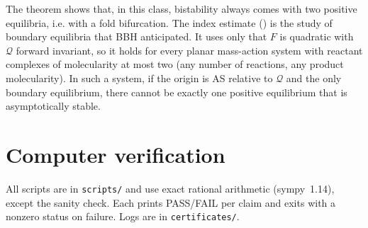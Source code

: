 \documentclass[11pt,a4paper]{report}
\newcommand{\Q}{\mathcal{Q}}
\begin{document}
\begin{remark}
The theorem shows that, in this class, bistability always comes with two positive equilibria, i.e. with a fold
bifurcation. The index estimate () is the study of boundary equilibria that BBH anticipated. It
uses only that \(F\) is quadratic with \(\Q\) forward invariant, so it holds for every planar mass-action system with
reactant complexes of molecularity at most two (any number of reactions, any product molecularity). In such a
system, if the origin is AS relative to \(\Q\) and the only boundary equilibrium, there cannot be exactly one positive
equilibrium that is asymptotically stable.
\end{remark}

\section{Computer verification}

All scripts are in \texttt{scripts/} and use exact rational arithmetic (sympy~1.14), except the sanity check.
Each prints PASS/FAIL per claim and exits with a nonzero status on failure. Logs are in \texttt{certificates/}.
\end{document}
